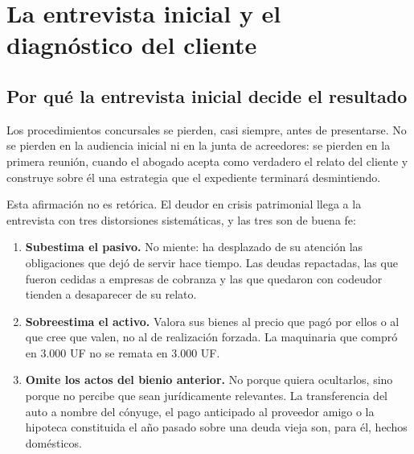 \chapter{La entrevista inicial y el diagnóstico del cliente}
\label{cap:entrevista}


\section{Por qué la entrevista inicial decide el resultado}

Los procedimientos concursales se pierden, casi siempre, antes de presentarse. No se
pierden en la audiencia inicial ni en la junta de acreedores: se pierden en la primera
reunión, cuando el abogado acepta como verdadero el relato del cliente y construye sobre
él una estrategia que el expediente terminará desmintiendo.

Esta afirmación no es retórica. El deudor en crisis patrimonial llega a la entrevista con
tres distorsiones sistemáticas, y las tres son de buena fe:

\begin{enumerate}
  \item \textbf{Subestima el pasivo.} No miente: ha desplazado de su atención las
  obligaciones que dejó de servir hace tiempo. Las deudas repactadas, las que fueron
  cedidas a empresas de cobranza y las que quedaron con codeudor tienden a desaparecer de
  su relato.

  \item \textbf{Sobreestima el activo.} Valora sus bienes al precio que pagó por ellos o
  al que cree que valen, no al de realización forzada. La maquinaria que compró en 3.000
  UF no se remata en 3.000 UF.

  \item \textbf{Omite los actos del bienio anterior.} No porque quiera ocultarlos, sino
  porque no percibe que sean jurídicamente relevantes. La transferencia del auto a nombre
  del cónyuge, el pago anticipado al proveedor amigo o la hipoteca constituida el año
  pasado sobre una deuda vieja son, para él, hechos domésticos.
\end{enumerate}

